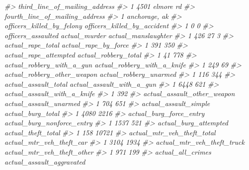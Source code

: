 \documentclass[
]{krantz}
\makeatletter
\newenvironment{Shaded}{\begin{snugshade}}{\end{snugshade}}
\newcommand{\CommentTok}[1]{\textcolor[rgb]{0.37,0.37,0.37}{\textit{#1}}}
\newenvironment{kframe}{%
\medskip{}
\setlength{\fboxsep}{.8em}
 \def\at@end@of@kframe{}%
 \ifinner\ifhmode%
  \def\at@end@of@kframe{\end{minipage}}%
  \begin{minipage}{\columnwidth}%
 \fi\fi%
 \def\FrameCommand##1{\hskip\@totalleftmargin \hskip-\fboxsep
 \colorbox{shadecolor}{##1}\hskip-\fboxsep
     \hskip-\linewidth \hskip-\@totalleftmargin \hskip\columnwidth}%
 \MakeFramed {\advance\hsize-\width
   \@totalleftmargin\z@ \linewidth\hsize
   \@setminipage}}%
 {\par\unskip\endMakeFramed%
 \at@end@of@kframe}
\renewenvironment{Shaded}{\begin{kframe}}{\end{kframe}}
\makeatother
\begin{document}
\begin{Shaded}
\begin{Highlighting}[]
\CommentTok{\#\textgreater{}   third\_line\_of\_mailing\_address}
\CommentTok{\#\textgreater{} 1                4501 elmore rd}
\CommentTok{\#\textgreater{}   fourth\_line\_of\_mailing\_address}
\CommentTok{\#\textgreater{} 1                  anchorage, ak}
\CommentTok{\#\textgreater{}   officers\_killed\_by\_felony officers\_killed\_by\_accident}
\CommentTok{\#\textgreater{} 1                         0                           0}
\CommentTok{\#\textgreater{}   officers\_assaulted actual\_murder actual\_manslaughter}
\CommentTok{\#\textgreater{} 1                426            27                   3}
\CommentTok{\#\textgreater{}   actual\_rape\_total actual\_rape\_by\_force}
\CommentTok{\#\textgreater{} 1               391                  350}
\CommentTok{\#\textgreater{}   actual\_rape\_attempted actual\_robbery\_total}
\CommentTok{\#\textgreater{} 1                    41                  778}
\CommentTok{\#\textgreater{}   actual\_robbery\_with\_a\_gun actual\_robbery\_with\_a\_knife}
\CommentTok{\#\textgreater{} 1                       249                          69}
\CommentTok{\#\textgreater{}   actual\_robbery\_other\_weapon actual\_robbery\_unarmed}
\CommentTok{\#\textgreater{} 1                         116                    344}
\CommentTok{\#\textgreater{}   actual\_assault\_total actual\_assault\_with\_a\_gun}
\CommentTok{\#\textgreater{} 1                 6448                       621}
\CommentTok{\#\textgreater{}   actual\_assault\_with\_a\_knife}
\CommentTok{\#\textgreater{} 1                         392}
\CommentTok{\#\textgreater{}   actual\_assault\_other\_weapon actual\_assault\_unarmed}
\CommentTok{\#\textgreater{} 1                         704                    651}
\CommentTok{\#\textgreater{}   actual\_assault\_simple actual\_burg\_total}
\CommentTok{\#\textgreater{} 1                  4080              2216}
\CommentTok{\#\textgreater{}   actual\_burg\_force\_entry actual\_burg\_nonforce\_entry}
\CommentTok{\#\textgreater{} 1                    1537                        521}
\CommentTok{\#\textgreater{}   actual\_burg\_attempted actual\_theft\_total}
\CommentTok{\#\textgreater{} 1                   158              10721}
\CommentTok{\#\textgreater{}   actual\_mtr\_veh\_theft\_total actual\_mtr\_veh\_theft\_car}
\CommentTok{\#\textgreater{} 1                       3104                     1934}
\CommentTok{\#\textgreater{}   actual\_mtr\_veh\_theft\_truck actual\_mtr\_veh\_theft\_other}
\CommentTok{\#\textgreater{} 1                        971                        199}
\CommentTok{\#\textgreater{}   actual\_all\_crimes actual\_assault\_aggravated}

\end{Highlighting}
\end{Shaded}
\end{document}
